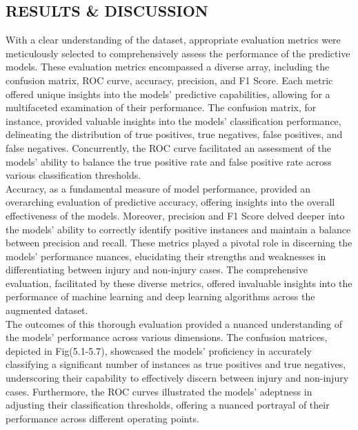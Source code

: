 \documentclass[12pt, English]{article}
\newcommand\tab[1][1cm]{\hspace*{#1}}
\begin{document}
\begin{normalsize}
\begin{center}
\section{ \Large RESULTS \& DISCUSSION}
\end{center}
\tab
\text
With a clear understanding of the dataset, appropriate evaluation metrics were meticulously selected to comprehensively assess the performance of the predictive models. These evaluation metrics encompassed a diverse array, including the confusion matrix, ROC curve, accuracy, precision, and F1 Score. Each metric offered unique insights into the models’ predictive capabilities, allowing for a multifaceted examination of their performance. The confusion matrix, for instance, provided valuable insights into the models’ classification performance, delineating the distribution of true positives, true negatives, false positives, and false negatives. Concurrently, the ROC curve facilitated an assessment of the models’ ability to balance the true positive rate and false positive rate across various classification thresholds.\\
\tab
Accuracy, as a fundamental measure of model performance, provided an overarching evaluation of predictive accuracy, offering insights into the overall effectiveness of the models. Moreover, precision and F1 Score delved deeper into the models’ ability to correctly identify positive instances and maintain a balance between precision and recall. These metrics played a pivotal role in discerning the models’ performance nuances, elucidating their strengths and weaknesses in differentiating between injury and non-injury cases. The comprehensive evaluation, facilitated by these diverse metrics, offered invaluable insights into the performance of machine learning and deep learning algorithms across the augmented dataset.\\
\tab
The outcomes of this thorough evaluation provided a nuanced understanding of the models’ performance across various dimensions. The confusion matrices, depicted in Fig(5.1-5.7), showcased the models’ proficiency in accurately classifying a significant number of instances as true positives and true negatives, underscoring their capability to effectively discern between injury and non-injury cases. Furthermore, the ROC curves illustrated the models' adeptness in adjusting their classification thresholds, offering a nuanced portrayal of their performance across different operating points.\\
\begin{figure}

\end{figure}
\end{normalsize}
\end{document}
